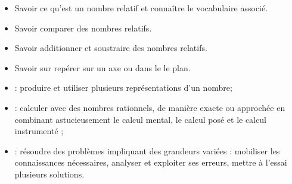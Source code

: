 \begin{myobj}
	\begin{itemize}
		
		\item Savoir ce qu’est un nombre relatif et connaître le vocabulaire associé.
		\item Savoir comparer des nombres relatifs.
		\item Savoir additionner et soustraire des nombres relatifs.
		\item Savoir sur repérer sur un axe ou dans le le plan.
			
	\end{itemize}
\end{myobj}

\vspace*{-0.3cm}

\begin{mycomp}
	\begin{itemize}
		\item {} :  produire et utiliser plusieurs représentations d’un nombre;
		\item {} :  calculer avec des nombres rationnels, de manière exacte ou approchée en combinant astucieusement le calcul mental, le calcul posé et le calcul instrumenté ;
		\item {} :  résoudre des problèmes impliquant des grandeurs variées : mobiliser les connaissances nécessaires, analyser et exploiter ses erreurs, mettre à l’essai plusieurs solutions.		
	\end{itemize}
\end{mycomp}


